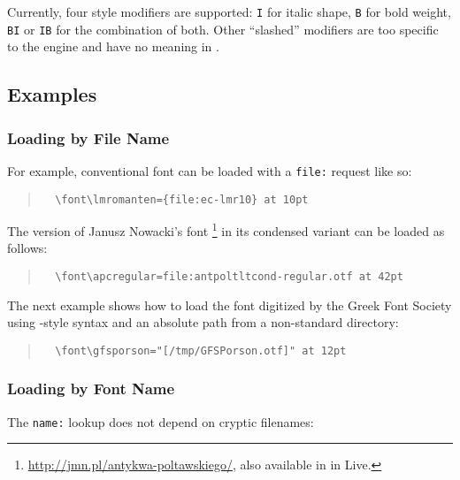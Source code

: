 \noindent
Currently, four style modifiers are supported:
  \verb|I| for italic shape,
  \verb|B| for bold   weight,
  \verb|BI| or \verb|IB| for the combination of both.
%
Other “slashed” modifiers are too specific to the \XETEX engine and
have no meaning in \LUATEX.

\subsection{Examples}

\subsubsection{Loading by File Name}

For example, conventional  font can be loaded with a \verb|file:|
request like so:

\begin{quote}
  \begin{verbatim}
  \font\lmromanten={file:ec-lmr10} at 10pt
  \end{verbatim}
\end{quote}

The \OpenType version of Janusz Nowacki’s font \footnote{%
  \url{http://jmn.pl/antykwa-poltawskiego/}, also available in
  in \TEX Live.
}
in its condensed variant can be loaded as follows:

\begin{quote}
  \begin{verbatim}
  \font\apcregular=file:antpoltltcond-regular.otf at 42pt
  \end{verbatim}
\end{quote}

The next example shows how to load the  font digitized by
the Greek Font Society using \XETEX-style syntax and an absolute path from a
non-standard directory:

\begin{quote}
  \begin{verbatim}
  \font\gfsporson="[/tmp/GFSPorson.otf]" at 12pt
  \end{verbatim}
\end{quote}

\subsubsection{Loading by Font Name}

The \verb|name:| lookup does not depend on cryptic filenames:

